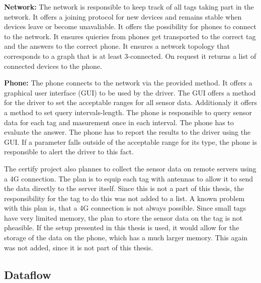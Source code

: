 \textbf{Network:} The network is responsible to keep track of all tags taking part in the network. 
It offers a joining protocol for new devices and remains stable when devices leave or become unavaliable. 
It offers the possibility for phones to connect to the network. 
It ensures quieries from phones get transported to the correct tag and the answers to the correct phone.
It ensures a network topology that corresponds to a graph that is at least 3-connected.
On request it returns a list of connected devices to the phone.

\textbf{Phone:} The phone connects to the network via the provided method.
It offers a graphical user interface (GUI) to be used by the driver.
The GUI offers a method for the driver to set the acceptable ranges for all sensor data.
Additionaly it offers a method to set query intervals-length.
The phone is responsible to query sensor data for each tag and masurement once in each interval.
The phone has to evaluate the answer.
The phone has to report the results to the driver using the GUI.
If a parameter falls outside of the acceptable range for its type, the phone is responsible to alert the driver to this fact.

The certify project also plannes to collect the sensor data on remote servers using a 4G connection.
The plan is to equip each tag with antennas to allow it to send the data directly to the server itself.
Since this is not a part of this thesis, the responsibility for the tag to do this was not added to a list.
A known problem with this plan is, that a 4G connection is not always possible.
Since small tags have very limited memory, the plan to store the sensor data on the tag is not pheasible.
If the setup presented in this thesis is used, it would allow for the storage of the data on the phone, which has a much larger memory.
This again was not added, since it is not part of this thesis.

\subsection{Dataflow}
\label{ss:dataflow}

